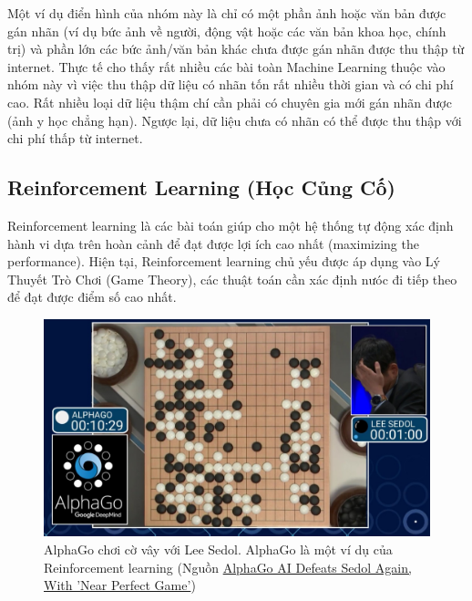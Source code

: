 Một ví dụ điển hình của nhóm này là chỉ có một phần ảnh hoặc văn bản được gán nhãn (ví dụ bức ảnh về người, động vật hoặc các văn bản khoa học, chính trị) và phần lớn các bức ảnh/văn bản khác chưa được gán nhãn được thu thập từ internet. Thực tế cho thấy rất nhiều các bài toàn Machine Learning thuộc vào nhóm này vì việc thu thập dữ liệu có nhãn tốn rất nhiều thời gian và có chi phí cao. Rất nhiều loại dữ liệu thậm chí cần phải có chuyên gia mới gán nhãn được (ảnh y học chẳng hạn). Ngược lại, dữ liệu chưa có nhãn có thể được thu thập với chi phí thấp từ internet.  
 
 
\subsection{Reinforcement Learning (Học Củng Cố)}
Reinforcement learning là các bài toán giúp cho một hệ thống tự động xác định hành vi dựa trên hoàn cảnh để đạt được lợi ích cao nhất (maximizing the performance). Hiện tại, Reinforcement learning chủ yếu được áp dụng vào Lý Thuyết Trò Chơi (Game Theory), các thuật toán cần xác định nưóc đi tiếp theo để đạt được điểm số cao nhất. 
 

 \begin{figure}
   \centering
   \includegraphics[width = .7\textwidth]{../categories/alphago.jpeg}
   \caption{AlphaGo chơi cờ vây với Lee Sedol. AlphaGo là một ví dụ của Reinforcement learning (Nguồn \href{http://www.tomshardware.com/news/alphago-defeats-sedol-second-time,31377.html}{AlphaGo AI Defeats Sedol Again, With 'Near Perfect Game'})}
   \label{fig:categories_alphago}
 \end{figure}
 
